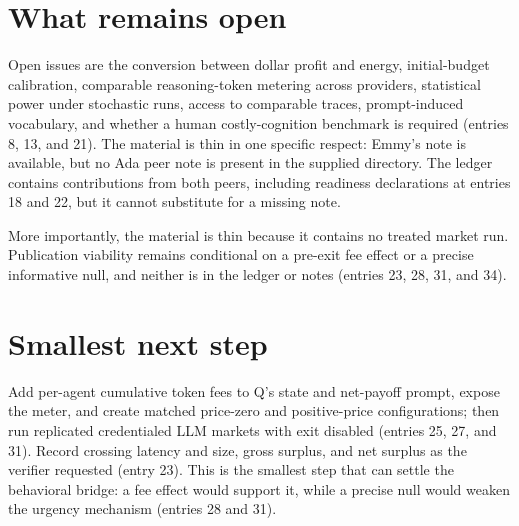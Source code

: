 \documentclass{article}
\begin{document}
\section*{What remains open}
Open issues are the conversion between dollar profit and energy, initial-budget calibration, comparable reasoning-token metering across providers, statistical power under stochastic runs, access to comparable traces, prompt-induced vocabulary, and whether a human costly-cognition benchmark is required (entries 8, 13, and 21). The material is thin in one specific respect: Emmy's note is available, but no Ada peer note is present in the supplied directory. The ledger contains contributions from both peers, including readiness declarations at entries 18 and 22, but it cannot substitute for a missing note.

More importantly, the material is thin because it contains no treated market run. Publication viability remains conditional on a pre-exit fee effect or a precise informative null, and neither is in the ledger or notes (entries 23, 28, 31, and 34).

\section*{Smallest next step}
Add per-agent cumulative token fees to Q's state and net-payoff prompt, expose the meter, and create matched price-zero and positive-price configurations; then run replicated credentialed LLM markets with exit disabled (entries 25, 27, and 31). Record crossing latency and size, gross surplus, and net surplus as the verifier requested (entry 23). This is the smallest step that can settle the behavioral bridge: a fee effect would support it, while a precise null would weaken the urgency mechanism (entries 28 and 31).
\end{document}
